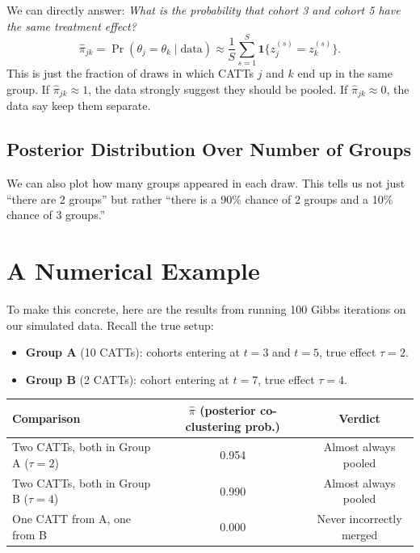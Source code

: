 \documentclass[12pt]{article}
\begin{document}
We can directly answer: \textit{What is the probability that cohort 3 and
cohort 5 have the same treatment effect?}
\begin{equation}
  \hat{\pi}_{jk} = \Pr(\theta_j = \theta_k \mid \text{data})
  \approx \frac{1}{S}\sum_{s=1}^{S} \mathbf{1}\{z_j^{(s)} = z_k^{(s)}\}.
\end{equation}
This is just the fraction of draws in which CATTs $j$ and $k$ end up in the
same group. If $\hat{\pi}_{jk} \approx 1$, the data strongly suggest they
should be pooled. If $\hat{\pi}_{jk} \approx 0$, the data say keep them
separate.

\subsection{Posterior Distribution Over Number of Groups}

We can also plot how many groups appeared in each draw. This tells us not just
``there are 2 groups'' but rather ``there is a 90\% chance of 2 groups and a
10\% chance of 3 groups.''

\section{A Numerical Example}

To make this concrete, here are the results from running 100 Gibbs iterations
on our simulated data. Recall the true setup:
\begin{itemize}
  \item \textbf{Group A} (10 CATTs): cohorts entering at $t=3$ and $t=5$,
    true effect $\tau = 2$.
  \item \textbf{Group B} (2 CATTs): cohort entering at $t=7$,
    true effect $\tau = 4$.
\end{itemize}

\begin{center}
\begin{tabular}{lcc}
\toprule
Comparison & $\hat\pi$ (posterior co-clustering prob.) & Verdict \\
\midrule
Two CATTs, both in Group A ($\tau=2$) & 0.954 & Almost always pooled \\
Two CATTs, both in Group B ($\tau=4$) & 0.990 & Almost always pooled \\
One CATT from A, one from B           & 0.000 & Never incorrectly merged \\
\bottomrule
\end{tabular}
\end{center}
\end{document}
